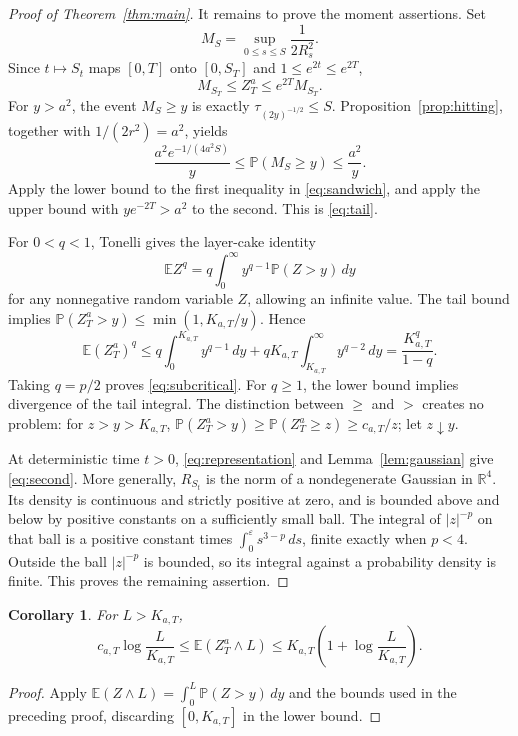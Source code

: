 \documentclass[11pt]{article}
\newtheorem{corollary}[theorem]{Corollary}
\theoremstyle{remark}\newtheorem{remark}[theorem]{Remark}
\newcommand{\E}{\mathbb E}\newcommand{\Pp}{\mathbb P}
\newcommand{\R}{\mathbb R}\newcommand{\T}{\mathbb T}
\begin{document}
\begin{proof}[Proof of Theorem~\ref{thm:main}]
It remains to prove the moment assertions. Set
\[
 M_S=\sup_{0\le s\le S}\frac1{2R_s^2}.
\]
Since $t\mapsto S_t$ maps $[0,T]$ onto $[0,S_T]$ and $1\le e^{2t}\le e^{2T}$,
\begin{equation}\label{eq:sandwich}
 M_{S_T}\le Z_T^a\le e^{2T}M_{S_T}.
\end{equation}
For $y>a^2$, the event $M_S\ge y$ is exactly $\tau_{(2y)^{-1/2}}\le S$. Proposition~\ref{prop:hitting}, together with $1/(2r^2)=a^2$, yields
\[
 \frac{a^2 e^{-1/(4a^2S)}}{y}
 \le\Pp(M_S\ge y)\le\frac{a^2}{y}.
\]
Apply the lower bound to the first inequality in \eqref{eq:sandwich}, and apply the upper bound with $y e^{-2T}>a^2$ to the second. This is \eqref{eq:tail}.

For $0<q<1$, Tonelli gives the layer-cake identity
\[
 \E Z^q=q\int_0^\infty y^{q-1}\Pp(Z>y)\,dy
\]
for any nonnegative random variable $Z$, allowing an infinite value. The tail bound implies $\Pp(Z_T^a>y)\le\min(1,K_{a,T}/y)$. Hence
\[
 \E(Z_T^a)^q
 \le q\int_0^{K_{a,T}}y^{q-1}\,dy
   +qK_{a,T}\int_{K_{a,T}}^\infty y^{q-2}\,dy
 =\frac{K_{a,T}^{q}}{1-q}.
\]
Taking $q=p/2$ proves \eqref{eq:subcritical}. For $q\ge1$, the lower bound implies divergence of the tail integral. The distinction between $\ge$ and $>$ creates no problem: for $z>y>K_{a,T}$, $\Pp(Z_T^a>y)\ge\Pp(Z_T^a\ge z)\ge c_{a,T}/z$; let $z\downarrow y$.

At deterministic time $t>0$, \eqref{eq:representation} and Lemma~\ref{lem:gaussian} give \eqref{eq:second}. More generally, $R_{S_t}$ is the norm of a nondegenerate Gaussian in $\R^4$. Its density is continuous and strictly positive at zero, and is bounded above and below by positive constants on a sufficiently small ball. The integral of $|z|^{-p}$ on that ball is a positive constant times $\int_0^\varepsilon s^{3-p}\,ds$, finite exactly when $p<4$. Outside the ball $|z|^{-p}$ is bounded, so its integral against a probability density is finite. This proves the remaining assertion.
\end{proof}

\begin{corollary}\label{cor:truncated}
For $L>K_{a,T}$,
\[
 c_{a,T}\log\frac{L}{K_{a,T}}
 \le\E(Z_T^a\wedge L)
 \le K_{a,T}\left(1+\log\frac{L}{K_{a,T}}\right).
\]
\end{corollary}
\begin{proof}
Apply $\E(Z\wedge L)=\int_0^L\Pp(Z>y)\,dy$ and the bounds used in the preceding proof, discarding $[0,K_{a,T}]$ in the lower bound.
\end{proof}
\end{document}
